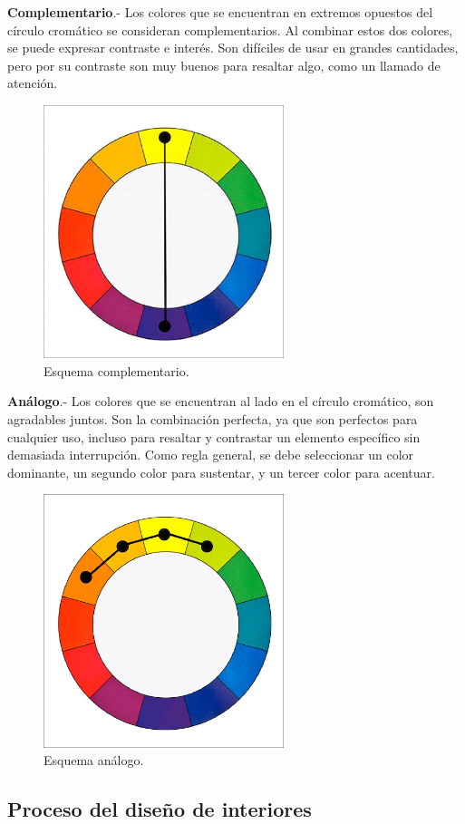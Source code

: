\textbf{Complementario}.- Los colores que se encuentran en extremos opuestos del círculo cromático se consideran complementarios. Al combinar estos dos colores, se puede expresar contraste e interés. Son difíciles de usar en grandes cantidades, pero por su contraste son muy buenos para resaltar algo, como un llamado de atención.
\begin{figure}[h!]
	\centering
	\includegraphics[width=7cm]{imagenes/marcoteorico/disenointeriores/complementario.png}
	\caption{Esquema complementario.}
	\label{fig:complementario}
\end{figure}

\textbf{Análogo}.- Los colores que se encuentran al lado en el círculo cromático, son agradables juntos. Son la combinación perfecta, ya que son perfectos para cualquier uso, incluso para resaltar y contrastar un elemento específico sin demasiada interrupción. Como regla general, se debe seleccionar un color dominante, un segundo color para sustentar, y un tercer color para acentuar.\cite{B13}
\begin{figure}[h!]
	\centering
	\includegraphics[width=7cm]{imagenes/marcoteorico/disenointeriores/analogo.png}
	\caption{Esquema análogo.}
	\label{fig:analogo}
\end{figure}

\subsection{Proceso del diseño de interiores}

\par 
